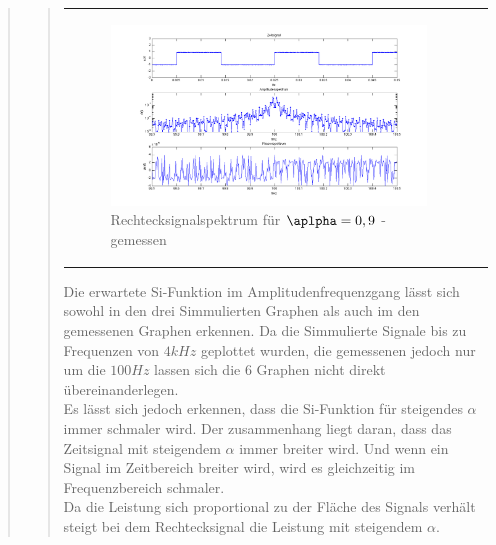 \begin{quote}
\begin{quote}
\begin{center}
\begin{tabular}{ll}
\begin{minipage}{0.6\textwidth}
                    \begin{figure}[H]
                        \label{fig:}            
                        \includegraphics[scale=0.3]{./Bilder/recht_alpha9_-_gemessen.png} %
                        \caption{Rechtecksignalspektrum für $\aplpha = 0,9$ - gemessen}
                    \end{figure}                
                
                \end{minipage}
                        
            \end{tabular}
            \end{center}
            
            Die erwartete Si-Funktion im Amplitudenfrequenzgang lässt sich sowohl in den drei Simmulierten Graphen als
            auch im den gemessenen Graphen erkennen. Da die Simmulierte Signale bis zu Frequenzen von $4 kHz$ geplottet
            wurden, die gemessenen jedoch nur um die $100 Hz$ lassen sich die 6 Graphen nicht direkt
            übereinanderlegen.\\
            Es lässt sich jedoch erkennen, dass die Si-Funktion für steigendes $\alpha$ immer schmaler wird. Der
            zusammenhang liegt daran, dass das Zeitsignal mit steigendem $\alpha$ immer breiter wird. Und wenn ein
            Signal im Zeitbereich breiter wird, wird es gleichzeitig im Frequenzbereich schmaler.\\
            
            Da die Leistung sich proportional zu der Fläche des Signals verhält steigt bei dem Rechtecksignal die
            Leistung mit steigendem $\alpha$.
                     

\end{quote}
\end{quote}
